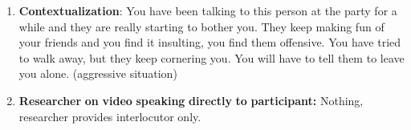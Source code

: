 \documentclass[output=paper]{langsci/langscibook}
\begin{document}
\begin{enumerate}
\item \textbf{Contextualization}: You have been talking to this person at the party for a while and they are really starting to bother you. They keep making fun of your friends and you find it insulting, you find them offensive. You have tried to walk away, but they keep cornering you. You will have to tell them to leave you alone. (aggressive situation) 

\item \textbf{Researcher} \textbf{on} \textbf{video} \textbf{speaking} \textbf{directly} \textbf{to} \textbf{participant:} Nothing, researcher provides interlocutor only.

\end{enumerate}
 

\sloppy
\printbibliography[heading=subbibliography,notkeyword=this] 
\end{document}
